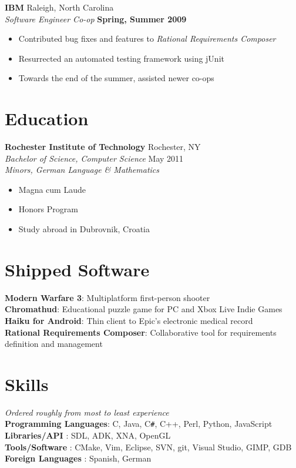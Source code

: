 \documentclass[line,margin]{res}
\newcommand{\CS}{C\texttt{\#}}
\begin{document}
\begin{resume}
    \textbf{IBM} \hfill Raleigh, North Carolina  \\
    \textsl{Software Engineer Co-op} \hfill \textbf{Spring, Summer 2009}
    \vspace{0.05in}
    \begin{itemize}
        \item Contributed bug fixes and features to \textsl{Rational Requirements Composer}
        \item Resurrected an automated testing framework using jUnit
        \item Towards the end of the summer, assisted newer co-ops 
    \end{itemize}

\section{\sc Education}          
    \textbf{Rochester Institute of Technology}     \hfill  Rochester, NY  \\        
    \textsl{Bachelor of Science, Computer Science} \hfill May 2011    \\
    \textsl{Minors, German Language \& Mathematics} 
    \begin{itemize} \itemsep -4pt
        \item Magna cum Laude 
        \item Honors Program 
        \item Study abroad in Dubrovnik, Croatia
    \end{itemize}

 
\section{\sc Shipped Software}
    \textbf{Modern Warfare 3}: Multiplatform first-person shooter \\
    \textbf{Chromathud}: Educational puzzle game for PC and Xbox Live Indie Games \\
    \textbf{Haiku for Android}: Thin client to Epic's electronic medical record  \\
    \textbf{Rational Requirements Composer}: Collaborative tool for requirements definition and management

\section{\sc Skills}          
    \textsl{\small Ordered roughly from most to least experience}                           \\
    \textbf{Programming Languages}: C, Java, \CS, C++, Perl, Python, JavaScript             \\
    \textbf{Libraries/API        }: SDL, ADK, XNA, OpenGL                                   \\
    \textbf{Tools/Software       }: CMake, Vim, Eclipse, SVN, git, Visual Studio, GIMP, GDB \\
    \textbf{Foreign Languages    }: Spanish, German


\end{resume}
\end{document}
